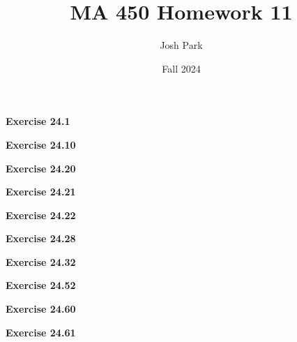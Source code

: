 \documentclass{article}
\author{Josh Park}
\date{\vspace*{-1em}Fall 2024}
\title{\vspace*{-2em}MA 450 Homework 11\vspace*{-1em}}
\begin{document}
\maketitle
\textbf{Exercise 24.1}
\newpage

\textbf{Exercise 24.10}
\newpage

\textbf{Exercise 24.20}
\newpage

\textbf{Exercise 24.21}
\newpage

\textbf{Exercise 24.22}
\newpage

\textbf{Exercise 24.28}
\newpage

\textbf{Exercise 24.32}
\newpage

\textbf{Exercise 24.52}
\newpage

\textbf{Exercise 24.60}
\newpage

\textbf{Exercise 24.61}
\newpage
\end{document}
